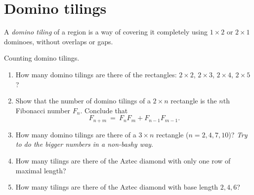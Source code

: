 \documentclass[11pt,fleqn]{book} %
\begin{document}
\newpage
\chapter{Domino tilings}
\setcounter{problem}{0}

\begin{definition}
    A \emph{domino tiling} of a region is a way of covering it completely using $1\times 2$ or $2\times 1$ dominoes, without overlaps or gaps.
\begin{center}
 \end{center}
\end{definition}

\begin{problem}
    Counting domino tilings.
    \begin{enumerate}[label=\alph*.]
        \item How many domino tilings are there of the rectangles: $2\times2$, $2\times3$, $2\times4$, $2\times5$?
        \item Show that the number of domino tilings of a $2\times n$ rectangle is the $n$th Fibonacci number $F_n$. Conclude that 
        $$F_{n+m} \ = \ F_n F_m + F_{n-1}F_{m-1}.$$
        \item How many domino tilings are there of a $3\times n$ rectangle ($n= 2 ,4, 7, 10$)? \textit{Try to do the bigger numbers in a non-bashy way}.
        \item How many tilings are there of the Aztec diamond with only one row of maximal length?
        \item How many tilings are there of the Aztec diamond with base length $2, 4, 6$?
    \end{enumerate}
\end{problem}
\end{document}
